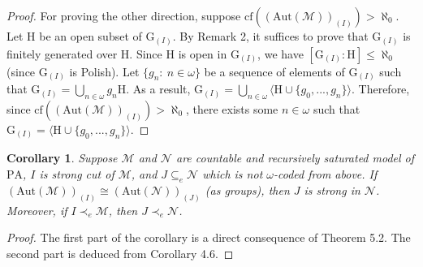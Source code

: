 \documentclass[11pt]{article}
\theoremstyle{plain}
\newtheorem{cor}[theorem]{Corollary}
\theoremstyle{definition}
\newcommand{\M}{\mathcal{M}}
\newcommand{\N}{\mathcal{N}}
\newcommand{\G}{\mathrm{G}}
\newcommand{\A}{\mathrm{Aut}}
\newcommand{\pa}{\mathrm{PA}}
\begin{document}
\begin{proof}
	For proving the other direction, suppose $\mathrm{cf}((\A(\M))_{(I)})>\aleph_{0}$. Let $\mathrm{H}$ be an open subset of $\G_{(I)}$. By Remark 2, it suffices to prove that  $\G_{(I)}$ is finitely generated over $\mathrm{H}$. Since $\mathrm{H}$ is open in $\G_{(I)}$, we have $[\G_{(I)}:\mathrm{H}]\leq\aleph_{0}$ (since $\G_{(I)}$ is Polish).  Let  $\{g_{n}: \ n\in \omega\}$ be a sequence of elements of $\G_{(I)}$ such that $\G_{(I)}=\bigcup_{n\in\omega}g_{n}\mathrm{H}$. As a result, $\G_{(I)}=\bigcup_{n\in\omega}\langle \mathrm{H}\cup\{g_{0},...,g_{n}\}\rangle$. Therefore, since $\mathrm{cf}((\A(\M))_{(I)})>\aleph_{0}$, there exists some $ n\in \omega$ such that $\G_{(I)}=\langle \mathrm{H}\cup\{g_{0},...,g_{n}\}\rangle$. 
\end{proof}

\begin{cor}
Suppose $\M$ and $\N$  are countable and recursively saturated model of $\pa$,  $I$ is strong cut of $\M$, and  $J\subseteq_{e}\N$ which is not $\omega$-coded from above. If   $(\A(\M))_{(I)}\cong(\A(\N))_{(J)} $ (as groups), then $J$ is strong in $\N$. Moreover, if $I\prec_{e}\M$, then $J\prec_{e}\N$.
\end{cor}
\begin{proof}
The first part of the corollary is a direct consequence of Theorem 5.2. The second part is deduced from Corollary 4.6.
\end{proof}
\end{document}
